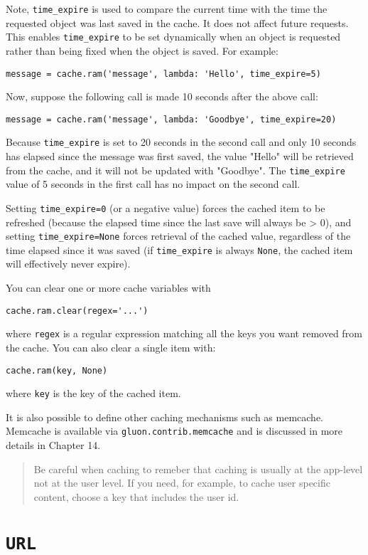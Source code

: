 \documentclass[justified,sixbynine,notoc]{tufte-book}
\def\ft{\small\tt}
\def\inxx#1{\index{#1}}
\begin{document}
\begin{fullwidth}
Note, {\ft time\_expire} is used to compare the current time with the time the requested object was last saved in the cache. It does not affect future requests. This enables {\ft time\_expire} to be set dynamically when an object is requested rather than being fixed when the object is saved. For example:
\begin{lstlisting}
message = cache.ram('message', lambda: 'Hello', time_expire=5)
\end{lstlisting}

Now, suppose the following call is made 10 seconds after the above call:
\begin{lstlisting}
message = cache.ram('message', lambda: 'Goodbye', time_expire=20)
\end{lstlisting}

Because {\ft time\_expire} is set to 20 seconds in the second call and only 10 seconds has elapsed since the message was first saved, the value "Hello" will be retrieved from the cache, and it will not be updated with "Goodbye". The {\ft time\_expire} value of 5 seconds in the first call has no impact on the second call.

Setting {\ft time\_expire=0} (or a negative value) forces the cached item to be refreshed (because the elapsed time since the last save will always be > 0), and setting {\ft time\_expire=None} forces retrieval of the cached value, regardless of the time elapsed since it was saved (if {\ft time\_expire} is always {\ft None}, the cached item will effectively never expire).

You can clear one or more cache variables with
\inxx{cache clear}

\begin{lstlisting}
cache.ram.clear(regex='...')
\end{lstlisting}
\noindent where {\ft regex} is a regular expression matching all the keys you want removed from the cache. You can also clear a single item with:
\begin{lstlisting}
cache.ram(key, None)
\end{lstlisting}
\noindent where {\ft key} is the key of the cached item.

It is also possible to define other caching mechanisms such as memcache. Memcache is available via {\ft gluon.contrib.memcache} and is discussed in more details in Chapter 14.

\begin{quote}Be careful when caching to remeber that caching is usually at the app-level not at the user level. If you need, for example, to cache user specific content, choose a key that includes the user id.\end{quote}
\goodbreak\section{{\ft URL}}


\end{fullwidth}
\end{document}
